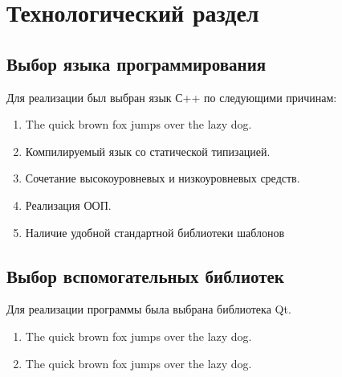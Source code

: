 \chapter{Технологический раздел}
\section{Выбор  языка программирования}
Для реализации  был выбран язык  С++ по следующими причинам:
\begin{enumerate}
	 \item The quick brown fox jumps over the lazy dog.
	 \item Компилируемый язык со статической типизацией. 
	 \item Сочетание высокоуровневых и низкоуровневых средств.
	 \item Реализация ООП.
	 \item Наличие удобной стандартной библиотеки шаблонов
	 \end{enumerate}
\section{Выбор вспомогательных библиотек}
Для реализации программы была выбрана библиотека Qt.
\begin{enumerate}
	\item The quick brown fox jumps over the lazy dog.
	\item The quick brown fox jumps over the lazy dog.
\end{enumerate}




